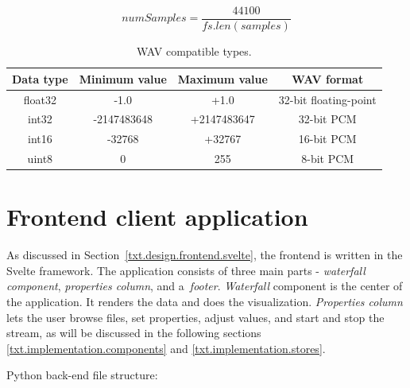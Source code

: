 \begin{equation}
    \label{formula:sampling}
    numSamples = \frac{44100}{fs.len(samples)}
\end{equation}


\begin{table}[]
    \centering
    \begin{tabular}{|c|c|c|c|}
    \hline
    \textbf{Data type} & \textbf{Minimum value} & \textbf{Maximum value} & \textbf{WAV format} \\
    \hline
    float32 & -1.0 & +1.0 & 32-bit floating-point \\ \hline
    int32 & -2147483648 & +2147483647 & 32-bit PCM \\ \hline
    int16 & -32768 & +32767 & 16-bit PCM \\ \hline
    uint8 & 0 & 255 & 8-bit PCM \\
    \hline
    \end{tabular}
    \caption{WAV compatible types.}
    \label{tab:my_label}
\end{table}

\section{Frontend client application}\label{txt.implementation.svelte}

As discussed in Section~\ref{txt.design.frontend.svelte}, the frontend is written in the Svelte framework. The application consists of three main parts - \textit{waterfall component}, \textit{properties column}, and a~\textit{footer}. \textit{Waterfall} component is the center of the application. It renders the data and does the visualization. \textit{Properties column} lets the user browse files, set properties, adjust values, and start and stop the stream, as will be discussed in the following sections \ref{txt.implementation.components} and \ref{txt.implementation.stores}.

\newpage
\bigskip
Python back-end file structure:

{\small
%
\label{dir:filestructure.svelte}
}
\bigskip

